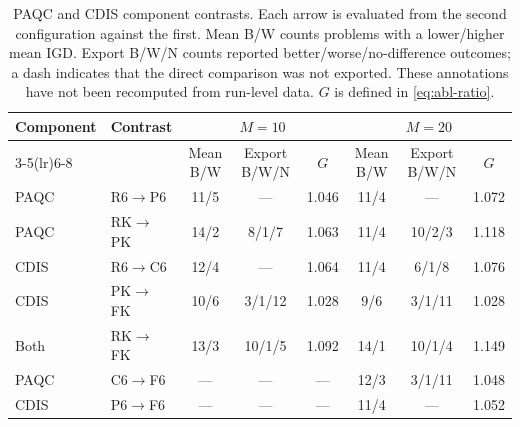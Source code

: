 \begin{table}[t]
\centering
\caption{PAQC and CDIS component contrasts. Each arrow is evaluated from the second configuration against the first. Mean B/W counts problems with a lower/higher mean IGD. Export B/W/N counts reported better/worse/no-difference outcomes; a dash indicates that the direct comparison was not exported. These annotations have not been recomputed from run-level data. $G$ is defined in \eqref{eq:abl-ratio}.}
\label{tab:exp:abl-effects}
\small
\begin{tabular}{llcccccc}
\toprule
Component & Contrast & \multicolumn{3}{c}{$M=10$} & \multicolumn{3}{c}{$M=20$} \\
\cmidrule(lr){3-5}\cmidrule(lr){6-8}
 & & Mean B/W & Export B/W/N & $G$ & Mean B/W & Export B/W/N & $G$ \\
\midrule
PAQC & R6$\to$P6 & 11/5 & --- & 1.046 & 11/4 & --- & 1.072 \\
PAQC & RK$\to$PK & 14/2 & 8/1/7 & 1.063 & 11/4 & 10/2/3 & 1.118 \\
CDIS & R6$\to$C6 & 12/4 & --- & 1.064 & 11/4 & 6/1/8 & 1.076 \\
CDIS & PK$\to$FK & 10/6 & 3/1/12 & 1.028 & 9/6 & 3/1/11 & 1.028 \\
Both & RK$\to$FK & 13/3 & 10/1/5 & 1.092 & 14/1 & 10/1/4 & 1.149 \\
PAQC & C6$\to$F6 & --- & --- & --- & 12/3 & 3/1/11 & 1.048 \\
CDIS & P6$\to$F6 & --- & --- & --- & 11/4 & --- & 1.052 \\
\bottomrule
\end{tabular}
\end{table}
